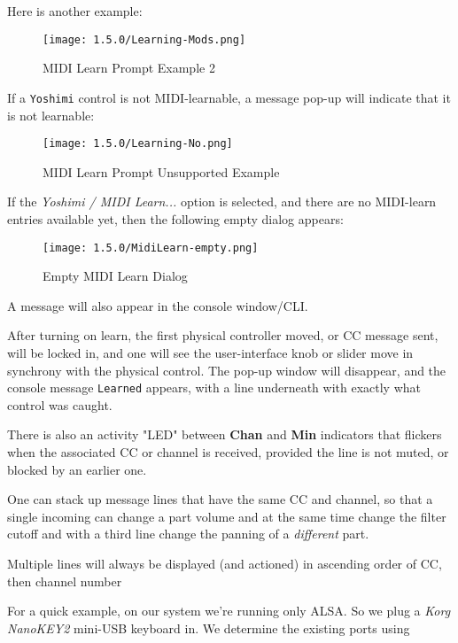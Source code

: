    Here is another example:

\begin{figure}[H]
   \centering 
   \texttt{[image: 1.5.0/Learning-Mods.png]}
   \caption{MIDI Learn Prompt Example 2}
   \label{fig:midi_learn_ex_2}
\end{figure}

   If a \texttt{Yoshimi} control is not MIDI-learnable, a message pop-up
   will indicate that it is not
   learnable:

\begin{figure}[H]
   \centering 
   \texttt{[image: 1.5.0/Learning-No.png]}
   \caption{MIDI Learn Prompt Unsupported Example}
   \label{fig:midi_learn_unsupported}
\end{figure}

   If the \textsl{Yoshimi / MIDI Learn...} option is selected, and there are no
   MIDI-learn entries available yet, then the following empty dialog appears:

\begin{figure}[H]
   \centering 
   \texttt{[image: 1.5.0/MidiLearn-empty.png]}
   \caption{Empty MIDI Learn Dialog}
   \label{fig:empty_midi_learn_dialog}
\end{figure}

   A message will also appear in the console window/CLI.

   After turning on learn, the first physical controller moved, or CC message
   sent, will be locked in, and one will see the user-interface knob or slider
   move in synchrony with the physical control. The pop-up window will
   disappear, and the console message \texttt{Learned} appears, with a line
   underneath with exactly what control was caught.

   There is also an activity "LED" between \textbf{Chan} and
   \textbf{Min} indicators that flickers when the associated CC or channel
   is received, provided the line is not muted, or blocked by an earlier one.

   One can stack up message lines that have the same CC and channel, so that a
   single incoming can change a part volume and at the same time change the
   filter cutoff and with a third line change the panning of a
   \textsl{different} part.

   Multiple lines will always be displayed (and actioned) in ascending order of
   CC, then channel number

   For a quick example, on our system we're running only ALSA.  So we
   plug a \textsl{Korg NanoKEY2} mini-USB keyboard in.
   We determine the existing ports using


